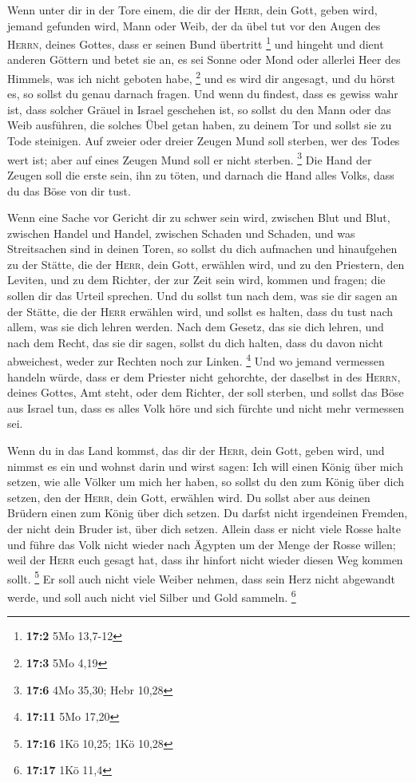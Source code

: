  Wenn unter dir in der Tore einem, die dir der
\textsc{Herr}, dein Gott, geben wird, jemand gefunden wird, Mann oder
Weib, der da übel tut vor den Augen des \textsc{Herrn}, deines Gottes,
dass er seinen Bund übertritt \footnote{\textbf{17:2} 5Mo 13,7-12}
 und hingeht und dient anderen Göttern und betet sie an,
es sei Sonne oder Mond oder allerlei Heer des Himmels, was ich nicht
geboten habe, \footnote{\textbf{17:3} 5Mo 4,19}  und es
wird dir angesagt, und du hörst es, so sollst du genau darnach fragen.
Und wenn du findest, dass es gewiss wahr ist, dass solcher Gräuel in
Israel geschehen ist,  so sollst du den Mann oder das Weib
ausführen, die solches Übel getan haben, zu deinem Tor und sollst sie zu
Tode steinigen.  Auf zweier oder dreier Zeugen Mund soll
sterben, wer des Todes wert ist; aber auf eines Zeugen Mund soll er
nicht sterben. \footnote{\textbf{17:6} 4Mo 35,30; Hebr 10,28}
 Die Hand der Zeugen soll die erste sein, ihn zu töten,
und darnach die Hand alles Volks, dass du das Böse von dir tust.

 Wenn eine Sache vor Gericht dir zu schwer sein wird,
zwischen Blut und Blut, zwischen Handel und Handel, zwischen Schaden und
Schaden, und was Streitsachen sind in deinen Toren, so sollst du dich
aufmachen und hinaufgehen zu der Stätte, die der \textsc{Herr}, dein
Gott, erwählen wird,  und zu den Priestern, den Leviten,
und zu dem Richter, der zur Zeit sein wird, kommen und fragen; die
sollen dir das Urteil sprechen.  Und du sollst tun nach
dem, was sie dir sagen an der Stätte, die der \textsc{Herr} erwählen
wird, und sollst es halten, dass du tust nach allem, was sie dich lehren
werden.  Nach dem Gesetz, das sie dich lehren, und nach
dem Recht, das sie dir sagen, sollst du dich halten, dass du davon nicht
abweichest, weder zur Rechten noch zur Linken. \footnote{\textbf{17:11}
  5Mo 17,20}  Und wo jemand vermessen handeln würde, dass
er dem Priester nicht gehorchte, der daselbst in des \textsc{Herrn},
deines Gottes, Amt steht, oder dem Richter, der soll sterben, und sollst
das Böse aus Israel tun,  dass es alles Volk höre und
sich fürchte und nicht mehr vermessen sei.

 Wenn du in das Land kommst, das dir der \textsc{Herr},
dein Gott, geben wird, und nimmst es ein und wohnst darin und wirst
sagen: Ich will einen König über mich setzen, wie alle Völker um mich
her haben,  so sollst du den zum König über dich setzen,
den der \textsc{Herr}, dein Gott, erwählen wird. Du sollst aber aus
deinen Brüdern einen zum König über dich setzen. Du darfst nicht
irgendeinen Fremden, der nicht dein Bruder ist, über dich setzen.
 Allein dass er nicht viele Rosse halte und führe das
Volk nicht wieder nach Ägypten um der Menge der Rosse willen; weil der
\textsc{Herr} euch gesagt hat, dass ihr hinfort nicht wieder diesen Weg
kommen sollt. \footnote{\textbf{17:16} 1Kö 10,25; 1Kö 10,28}
 Er soll auch nicht viele Weiber nehmen, dass sein Herz
nicht abgewandt werde, und soll auch nicht viel Silber und Gold sammeln.
\footnote{\textbf{17:17} 1Kö 11,4}

